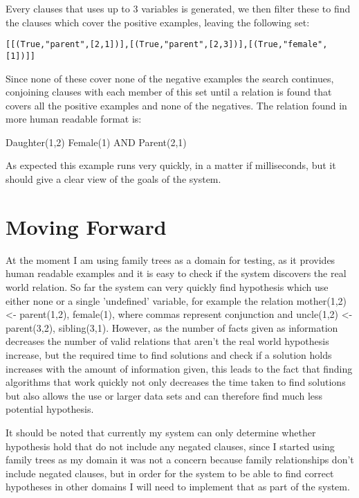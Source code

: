 \documentclass{article}
\begin{document}
Every clauses that uses up to 3 variables is generated, we then filter these to find 
the clauses which cover the positive examples, leaving the following set:

\begin{verbatim}
[[(True,"parent",[2,1])],[(True,"parent",[2,3])],[(True,"female",[1])]]
\end{verbatim}

Since none of these cover none of the negative examples the search continues, conjoining 
clauses with each member of this set until a relation is found that covers all the positive 
examples and none of the negatives. The relation found in more human readable format is:

Daughter(1,2) \leftarrow Female(1) AND Parent(2,1)

As expected this example runs very quickly, in a matter if milliseconds, but it should give
a clear view of the goals of the system.

\section{Moving Forward}

At the moment I am using family trees as a domain for testing, as it provides
human readable examples and it is easy to check if the system discovers the
real world relation. So far the system can very quickly find hypothesis
which use either none or a single 'undefined' variable, for example the
relation mother(1,2) <- parent(1,2), female(1), where commas represent
conjunction and uncle(1,2) <- parent(3,2), sibling(3,1). However, as the number
of facts given as information decreases the number of valid relations that
aren't the real world hypothesis increase, but the required time to find
solutions and check if a solution holds increases with the amount of information
given, this leads to the fact that finding algorithms that work quickly not
only decreases the time taken to find solutions but also allows the use or
larger data sets and can therefore find much less potential hypothesis.

It should be noted that currently my system can only determine whether
hypothesis hold that do not include any negated clauses, since I started using
family trees as my domain it was not a concern because family relationships
don't include negated clauses, but in order for the system to be able to find
correct hypotheses in other domains I will need to implement that as part of
the system.
\end{document}
